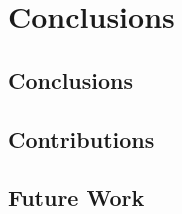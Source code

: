 \chapter{Conclusions}
\label{chap:conc}

\section{Conclusions}


\section{Contributions}

\section{Future Work}

